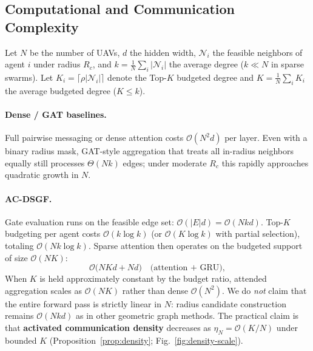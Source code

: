 \subsection{Computational and Communication Complexity}
\label{sec:complexity}

Let $N$ be the number of UAVs, $d$ the hidden width, $\mathcal{N}_i$ the
feasible neighbors of agent $i$ under radius $R_c$, and
$k=\tfrac{1}{N}\sum_i|\mathcal{N}_i|$ the average degree ($k\ll N$ in sparse
swarms).
Let $K_i=\lceil\rho|\mathcal{N}_i|\rceil$ denote the Top-$K$ budgeted degree
and $K=\tfrac{1}{N}\sum_i K_i$ the average budgeted degree ($K\le k$).

\paragraph{Dense / GAT baselines.}
Full pairwise messaging or dense attention costs
$\mathcal{O}(N^{2}d)$ per layer.
Even with a binary radius mask, GAT-style aggregation that treats all
in-radius neighbors equally still processes $\Theta(Nk)$ edges; under moderate
$R_c$ this rapidly approaches quadratic growth in $N$.

\paragraph{AC-DSGF.}
Gate evaluation runs on the feasible edge set:
$\mathcal{O}(|E|d)=\mathcal{O}(Nkd)$.
Top-$K$ budgeting per agent costs $\mathcal{O}(k\log k)$ (or
$\mathcal{O}(K\log k)$ with partial selection), totaling
$\mathcal{O}(Nk\log k)$.
Sparse attention then operates on the budgeted support of size $\mathcal{O}(NK)$:
\begin{equation}
\mathcal{O}\!\bigl(NKd + Nd\bigr)
\quad\text{(attention + GRU)},
\label{eq:ac-complexity}
\end{equation}
When $K$ is held approximately constant by the budget ratio, attended
aggregation scales as $\mathcal{O}(NK)$ rather than dense $\mathcal{O}(N^{2})$.
We do \emph{not} claim that the entire forward pass is strictly linear in $N$:
radius candidate construction remains $\mathcal{O}(Nkd)$ as in other geometric
graph methods.
The practical claim is that \textbf{activated communication density}
decreases as $\eta_N=\mathcal{O}(K/N)$ under bounded $K$
(Proposition~\ref{prop:density}; Fig.~\ref{fig:density-scale}).

